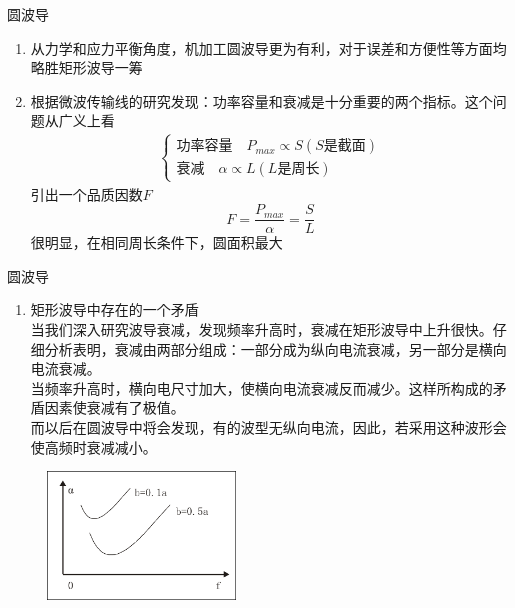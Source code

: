 \begin{frame}{圆波导}
    \begin{enumerate}
        \resume
        \item 从力学和应力平衡角度，机加工圆波导更为有利，对于误差和方便性等方面均略胜矩形波导一筹
        \item 根据微波传输线的研究发现：功率容量和衰减是十分重要的两个指标。这个问题从广义上看\\
              \begin{align*}
                  \begin{cases}
                      \textbf{功率容量}\quad P_{max}\propto S (S是截面) \\
                      \textbf{衰减} \quad \alpha \propto L (L是周长)
                  \end{cases}
              \end{align*}
              引出一个品质因数$F$
              $$F=\frac{P_{max}}{\alpha}=\frac{S}{L}$$
              很明显，在相同周长条件下，圆面积最大
              \saveenum
    \end{enumerate}
\end{frame}

\begin{frame}{圆波导}
    \begin{enumerate}
        \resume
        \item 矩形波导中存在的一个矛盾\\
              当我们深入研究波导衰减，发现频率升高时，衰减在矩形波导中上升很快。仔细分析表明，衰减由两部分组成：一部分成为纵向电流衰减，另一部分是横向电流衰减。\\
              当频率升高时，横向电尺寸加大，使横向电流衰减反而减少。这样所构成的矛盾因素使衰减有了极值。\\
              而以后在圆波导中将会发现，有的波型无纵向电流，因此，若采用这种波形会使高频时衰减减小。
    \end{enumerate}
    \begin{figure}
        \includegraphics[width=5cm]{Cha6//fig6-17.png}
    \end{figure}
\end{frame}

